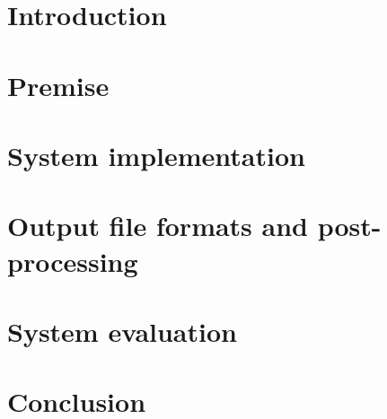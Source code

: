 \documentclass[english, numeric, fleqn, draft]{tauthesis}
\begin{document}
\tableofcontents


\glossary


\mainmatter

\chapter{Introduction}
\label{ch:1-introduction}


\chapter{Premise}
\label{ch:2-premise}


\chapter{System implementation}
\label{ch:3-system}


\chapter{Output file formats and post-processing}
\label{ch:4-files-and-post}


\chapter{System evaluation}
\label{ch:5-evaluation}


\chapter{Conclusion}
\label{ch:6-conclusion}


\printbibliography[heading=bibintoc]

\end{document}
